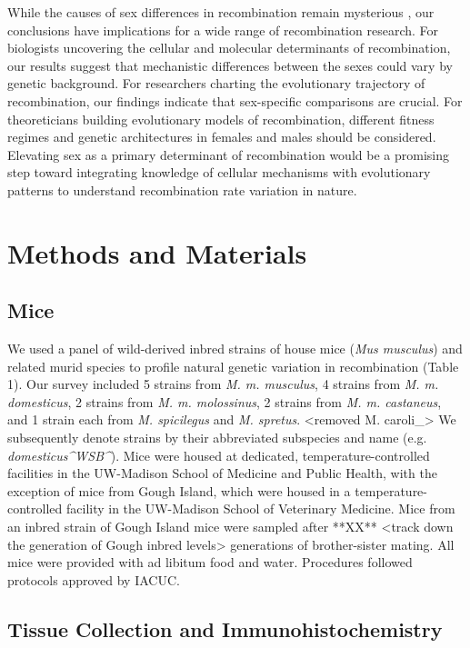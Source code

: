 \documentclass[9pt,lineno]{elife}
\begin{document}
While the causes of sex differences in recombination remain mysterious \citep{lenormand2016}, our conclusions have implications for a wide range of recombination research. For biologists uncovering the cellular and molecular determinants of recombination, our results suggest that mechanistic differences between the sexes could vary by genetic background. For researchers charting the evolutionary trajectory of recombination, our findings indicate that sex-specific comparisons are crucial. For theoreticians building evolutionary models of recombination, different fitness regimes and genetic architectures in females and males should be considered. Elevating sex as a primary determinant of recombination would be a promising step toward integrating knowledge of cellular mechanisms with evolutionary patterns to understand recombination rate variation in nature.

\section{Methods and Materials}

\subsection{Mice}

We used a panel of wild-derived inbred strains of house mice (\emph{Mus musculus}) and related murid species to profile natural genetic variation in recombination (Table 1). Our survey included 5 strains from \emph{M. m. musculus}, 4 strains from \emph{M. m. domesticus}, 2 strains from \emph{M. m. molossinus}, 2 strains from \emph{M. m. castaneus}, and 1 strain each from \emph{M. spicilegus} and \emph{M. spretus}. <removed M. caroli_> We subsequently denote strains by their abbreviated subspecies and name (e.g. \emph{domesticus^WSB^}). Mice were housed at dedicated, temperature-controlled facilities in the UW-Madison School of Medicine and Public Health, with the exception of mice from Gough Island, which were housed in a temperature-controlled facility in the UW-Madison School of Veterinary Medicine. Mice from an inbred strain of Gough Island mice were sampled after **XX** <track down the generation of Gough inbred levels> generations of brother-sister mating. All mice were provided with ad libitum food and water. Procedures followed protocols approved by IACUC.

\subsection{Tissue Collection and Immunohistochemistry}
\end{document}

